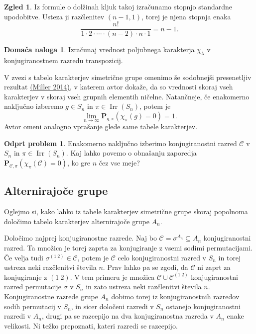 \documentclass[11pt]{book}
\def\conclass{\mathcal{C}}
\def\PP{\mathbf{P}}
\DeclareMathOperator\Irr{Irr}
\theoremstyle{definition}
\theoremstyle{zgled}
\newtheorem*{zgled}{Zgled}
\theoremstyle{odprtproblem}
\newtheorem*{odprtproblem}{Odprt problem}
\theoremstyle{domacanaloga}
\newtheorem*{domacanaloga}{Domača naloga}
\theoremstyle{izrek}
\begin{document}
\begin{zgled}
Iz formule o dolžinah kljuk takoj izračunamo stopnjo standardne upodobitve. Usteza ji razčlenitev $(n-1,1)$, torej je njena stopnja enaka
\[
    \frac{n!}{1 \cdot 2 \cdot \cdots \cdot (n-2) \cdot n \cdot 1} = n-1.
\]
\end{zgled}

\begin{domacanaloga}
Izračunaj vrednost poljubnega karakterja $\chi_{\lambda}$ v konjugiranostnem razredu transpozicij.
\end{domacanaloga}

V zvezi s tabelo karakterjev simetrične grupe omenimo še sodobnejši presenetljiv rezultat \href{https://link.springer.com/article/10.1007/s00209-014-1290-x}{(Miller 2014)}, v katerem avtor dokaže, da so vrednosti skoraj vseh karakterjev v skoraj vseh grupnih elementih ničelne. Natančneje, če enakomerno naključno izberemo $g \in S_n$ in $\pi \in \Irr(S_n)$, potem je
\[
    \lim_{n \to \infty} \PP_{g, \pi}\left(\chi_{\pi}(g) = 0\right) = 1.
\]
Avtor omeni analogno vprašanje glede same tabele karakterjev.

\begin{odprtproblem}
Enakomerno naključno izberimo konjugiranostni razred $\conclass$ v $S_n$ in $\pi \in \Irr(S_n)$. Kaj lahko povemo o obnašanju zaporedja $\PP_{\conclass, \pi}\left( \chi_{\pi}(\conclass) = 0 \right)$, ko gre $n$ čez vse meje?
\end{odprtproblem}

\subsection{Alternirajoče grupe}

Oglejmo si, kako lahko iz tabele karakterjev simetrične grupe skoraj popolnoma določimo tabelo karakterjev alternirajoče grupe $A_n$.

Določimo najprej konjugiranostne razrede. Naj bo $\conclass = \sigma^{A_n} \subseteq A_n$ konjugiranostni razred. Ta množica je torej zaprta za konjugiranje z vsemi sodimi permutacijami. Če velja tudi $\sigma^{(1 \ 2)} \in \conclass$, potem je $\conclass$ celo konjugiranostni razred v $S_n$ in torej ustreza neki razčlenitvi števila $n$. Prav lahko pa se zgodi, da $\conclass$ ni zaprt za konjugiranje z $(1 \ 2)$. V tem primeru je množica $\conclass \cup \conclass^{(1 \ 2)}$ konjugiranostni razred permutacije $\sigma$ v $S_n$ in zato ustreza neki razčlenitvi števila $n$. Konjugiranostne razrede grupe $A_n$ dobimo torej iz konjugiranostnih razredov sodih permutacij v $S_n$, in sicer določeni razredi v $S_n$ ostanejo konjugiranostni razredi v $A_n$, drugi pa se razcepijo na dva konjugiranostna razreda v $A_n$ enake velikosti. Ni težko prepoznati, kateri razredi se razcepijo.
\end{document}
